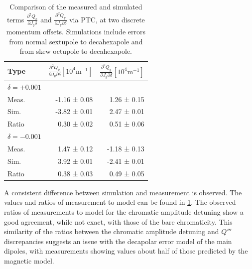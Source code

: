 \begin{table}[H]
  \centering
  \begin{tabular}{lrr}
  \toprule
   Type  & $\frac{\partial^2 Q_x}{\partial J_y \partial \delta}[10^{4}\mathrm{m}^{-1}]$ & $\frac{\partial^2 Q_y}{\partial J_y \partial \delta}[10^{4}\mathrm{m}^{-1}]$ \\
  \midrule
  $\delta = +0.001$ & & \\
  \hspace{2mm}Meas.  &   -1.16 ± 0.08 &   1.26 ± 0.15 \\
  \hspace{2mm}Sim.   &   -3.82 ± 0.01 &   2.47 ± 0.01 \\
  \hspace{2mm}Ratio  &    0.30 ± 0.02 &   0.51 ± 0.06 \\
  $\delta = -0.001$ & & \\
  \hspace{2mm}Meas.  &  1.47 ± 0.12  &  -1.18 ± 0.13 \\
  \hspace{2mm}Sim.   &  3.92 ± 0.01  &  -2.41 ± 0.01 \\
  \hspace{2mm}Ratio  &  0.38 ± 0.03  &   0.49 ± 0.05 \\
  \bottomrule
  \end{tabular}
  \caption{Comparison of the measured and simulated terms $\frac{\partial^2 Q_x}{\partial J_y
   \delta}$ and $\frac{\partial^2 Q_y}{\partial J_y \partial \delta}$ via PTC, at two
  discrete momentum offsets. Simulations include errors from normal sextupole to decahexapole and
  from skew octupole to decahexapole.}
  \label{table:decapoles:chromatic_ampdet}
\end{table}


A consistent difference between simulation and measurement is observed. The values and
ratios of measurement to model can be found in \cref{table:decapoles:chromatic_ampdet}.
The observed ratios of measurements to model for the chromatic amplitude detuning show a good
agreement, while not exact, with those of the bare chromaticity.
This similarity of the ratios between the chromatic amplitude detuning and $Q'''$ discrepancies
suggests an issue with the decapolar error model of the main dipoles, with measurements showing
values about half of those predicted by the magnetic model.
